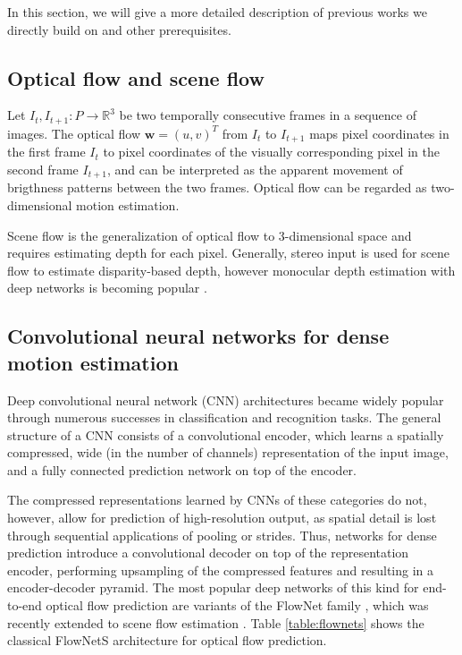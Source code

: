 In this section, we will give a more detailed description of previous works
we directly build on and other prerequisites.

\subsection{Optical flow and scene flow}
Let $I_t,I_{t+1} : P \to \mathbb{R}^3$ be two temporally consecutive frames in a
sequence of images.
The optical flow
$\mathbf{w} = (u, v)^T$ from $I_t$ to $I_{t+1}$
maps pixel coordinates in the first frame $I_t$ to pixel coordinates of the
visually corresponding pixel in the second frame $I_{t+1}$,
and can be interpreted as the apparent movement of brigthness patterns between the two frames.
Optical flow can be regarded as two-dimensional motion estimation.

Scene flow is the generalization of optical flow to 3-dimensional space and
requires estimating depth for each pixel. Generally, stereo input is used for scene flow
to estimate disparity-based depth, however monocular depth estimation with deep networks is becoming
popular \cite{DeeperDepth}.

\subsection{Convolutional neural networks for dense motion estimation}
Deep convolutional neural network (CNN) architectures
\cite{ImageNetCNN, VGGNet, ResNet}
became widely popular through numerous successes in classification and recognition tasks.
The general structure of a CNN consists of a convolutional encoder, which
learns a spatially compressed, wide (in the number of channels) representation of the input image,
and a fully connected prediction network on top of the encoder.

The compressed representations learned by CNNs of these categories do not, however, allow
for prediction of high-resolution output, as spatial detail is lost through sequential applications
of pooling or strides.
Thus, networks for dense prediction introduce a convolutional decoder on top of the representation encoder,
performing upsampling of the compressed features and resulting in a encoder-decoder pyramid.
The most popular deep networks of this kind for end-to-end optical flow prediction
are variants of the FlowNet family \cite{FlowNet, FlowNet2},
which was recently extended to scene flow estimation \cite{SceneFlowDataset}.
Table \ref{table:flownets} shows the classical FlowNetS architecture for optical flow prediction.


